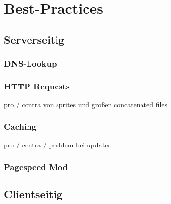 \section{Best-Practices} %
\label{sec:best_practices}

	\subsection{Serverseitig}
	\label{sub:serverseitig}

		\subsubsection{DNS-Lookup} %
		\label{ssub:dns_lookup}
		

		\subsubsection{HTTP Requests} %
		\label{ssub:http_requests}
		pro / contra von sprites und großen concatenated files

		\subsubsection{Caching} %
		\label{ssub:caching}
		pro / contra / problem bei updates

		\subsubsection{Pagespeed Mod} %
		\label{ssub:pagespeed_mod}
		




	\subsection{Clientseitig}
	\label{sub:clientseitig}
	

